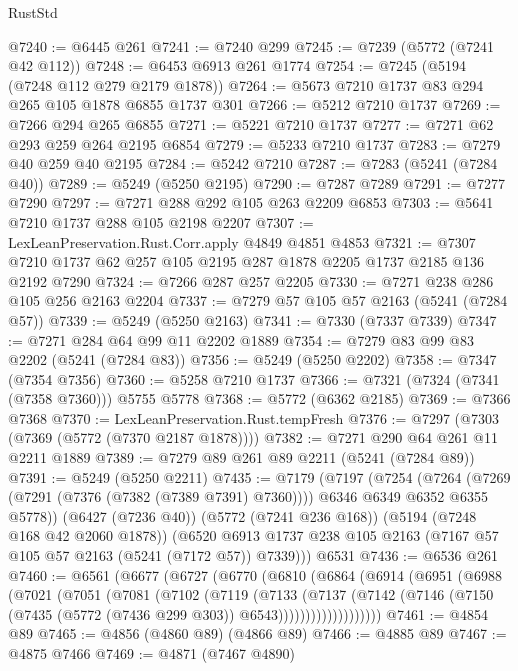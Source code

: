 \begin{lexlean}{RustStd}
\begin{coremodule}
@7240 := @6445 @261
@7241 := @7240 @299
@7245 := @7239 (@5772 (@7241 @42 @112))
@7248 := @6453 @6913 @261 @1774
@7254 := @7245 (@5194 (@7248 @112 @279 @2179 @1878))
@7264 := @5673 @7210 @1737 @83 @294 @265 @105 @1878 @6855 @1737 @301
@7266 := @5212 @7210 @1737
@7269 := @7266 @294 @265 @6855
@7271 := @5221 @7210 @1737
@7277 := @7271 @62 @293 @259 @264 @2195 @6854
@7279 := @5233 @7210 @1737
@7283 := @7279 @40 @259 @40 @2195
@7284 := @5242 @7210
@7287 := @7283 (@5241 (@7284 @40))
@7289 := @5249 (@5250 @2195)
@7290 := @7287 @7289
@7291 := @7277 @7290
@7297 := @7271 @288 @292 @105 @263 @2209 @6853
@7303 := @5641 @7210 @1737 @288 @105 @2198 @2207
@7307 := LexLeanPreservation.Rust.Corr.apply @4849 @4851 @4853
@7321 := @7307 @7210 @1737 @62 @257 @105 @2195 @287 @1878 @2205 @1737 @2185 @136 @2192 @7290
@7324 := @7266 @287 @257 @2205
@7330 := @7271 @238 @286 @105 @256 @2163 @2204
@7337 := @7279 @57 @105 @57 @2163 (@5241 (@7284 @57))
@7339 := @5249 (@5250 @2163)
@7341 := @7330 (@7337 @7339)
@7347 := @7271 @284 @64 @99 @11 @2202 @1889
@7354 := @7279 @83 @99 @83 @2202 (@5241 (@7284 @83))
@7356 := @5249 (@5250 @2202)
@7358 := @7347 (@7354 @7356)
@7360 := @5258 @7210 @1737
@7366 := @7321 (@7324 (@7341 (@7358 @7360))) @5755 @5778
@7368 := @5772 (@6362 @2185)
@7369 := @7366 @7368
@7370 := LexLeanPreservation.Rust.tempFresh
@7376 := @7297 (@7303 (@7369 (@5772 (@7370 @2187 @1878))))
@7382 := @7271 @290 @64 @261 @11 @2211 @1889
@7389 := @7279 @89 @261 @89 @2211 (@5241 (@7284 @89))
@7391 := @5249 (@5250 @2211)
@7435 := @7179
    (@7197
      (@7254
        (@7264 (@7269 (@7291 (@7376 (@7382 (@7389 @7391) @7360)))) @6346 @6349 @6352 @6355 @5778))
      (@6427 (@7236 @40))
      (@5772 (@7241 @236 @168))
      (@5194 (@7248 @168 @42 @2060 @1878))
      (@6520 @6913 @1737 @238 @105 @2163 (@7167 @57 @105 @57 @2163 (@5241 (@7172 @57)) @7339)))
    @6531
@7436 := @6536 @261
@7460 := @6561
    (@6677
      (@6727
        (@6770
          (@6810
            (@6864
              (@6914
                (@6951
                  (@6988
                    (@7021
                      (@7051
                        (@7081
                          (@7102
                            (@7119
                              (@7133
                                (@7137
                                  (@7142
                                    (@7146
                                      (@7150
                                        (@7435 (@5772 (@7436 @299 @303)) @6543)))))))))))))))))))
@7461 := @4854 @89
@7465 := @4856 (@4860 @89) (@4866 @89)
@7466 := @4885 @89
@7467 := @4875 @7466
@7469 := @4871 (@7467 @4890)

\end{coremodule}
\end{lexlean}
